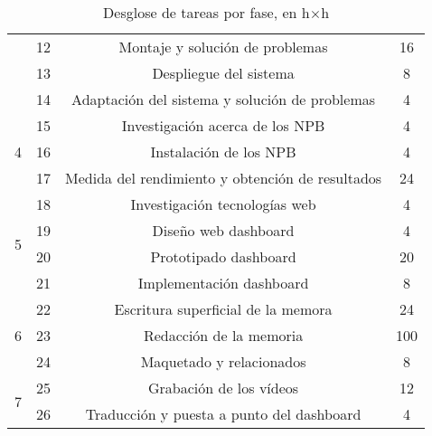 \begin{table}[h!]
\begin{tabular}{ |c|c|c|c| }
                            & 12    & {Montaje y solución de problemas}                                         & 16 \\\cline{2-4}
                            & 13    & {Despliegue del sistema}                                                  & 8 \\\cline{2-4}
                            & 14    & {Adaptación del sistema y solución de problemas}                          & 4 \\
  \hline
  \multirow{3}{*}{4}        & 15    & {Investigación acerca de los NPB}                                         & 4 \\\cline{2-4}
                            & 16    & {Instalación de los NPB}                                                  & 4 \\\cline{2-4}
                            & 17    & {Medida del rendimiento y obtención de resultados}                        & 24 \\
  \hline
  \multirow{4}{*}{5}        & 18    & {Investigación tecnologías web}                                           & 4 \\\cline{2-4}
                            & 19    & {Diseño web dashboard}                                                    & 4 \\\cline{2-4}
                            & 20    & {Prototipado dashboard}                                                   & 20 \\\cline{2-4}
                            & 21    & {Implementación dashboard}                                                & 8 \\
  \hline
  \multirow{3}{*}{6}        & 22    & {Escritura superficial de la memora}                                      & 24 \\\cline{2-4}
                            & 23    & {Redacción de la memoria}                                                 & 100 \\\cline{2-4}
                            & 24    & {Maquetado y relacionados}                                                & 8 \\
  \hline
  \multirow{2}{*}{7}        & 25    & {Grabación de los vídeos}                                      & 12 \\\cline{2-4}
                            & 26    & {Traducción y puesta a punto del dashboard}                    & 4 \\
  \hline
  \end{tabular}
  \caption{Desglose de tareas por fase, en h$\times$h}
  \label{tab:desglose_de_tareas}
\end{table}

